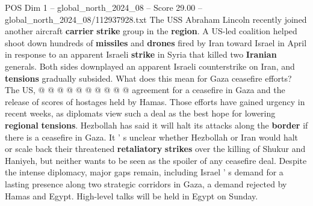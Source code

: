 \begin{textsample}{POS Dim 1 – global\_north\_2024\_08 – Score 29.00 – global\_north\_2024\_08/112937928.txt}
The USS Abraham Lincoln recently joined another aircraft \textbf{carrier} \textbf{strike} group in the \textbf{region}.
A US-led coalition helped shoot down hundreds of \textbf{missiles} and \textbf{drones} fired by Iran toward Israel in April in response to an apparent Israeli \textbf{strike} in Syria that killed two \textbf{Iranian} generals.
Both sides downplayed an apparent Israeli counterstrike on Iran, and \textbf{tensions} gradually subsided.
What does this mean for Gaza ceasefire efforts?
The US, @ @ @ @ @ @ @ @ @ @ agreement for a ceasefire in Gaza and the release of scores of hostages held by Hamas.
Those efforts have gained urgency in recent weeks, as diplomats view such a deal as the best hope for lowering \textbf{regional} \textbf{tensions}.
Hezbollah has said it will halt its attacks along the \textbf{border} if there is a ceasefire in Gaza.
It ' s unclear whether Hezbollah or Iran would halt or scale back their threatened \textbf{retaliatory} \textbf{strikes} over the killing of Shukur and Haniyeh, but neither wants to be seen as the spoiler of any ceasefire deal.
Despite the intense diplomacy, major gaps remain, including Israel ' s demand for a lasting presence along two strategic corridors in Gaza, a demand rejected by Hamas and Egypt.
High-level talks will be held in Egypt on Sunday.

\end{textsample}
